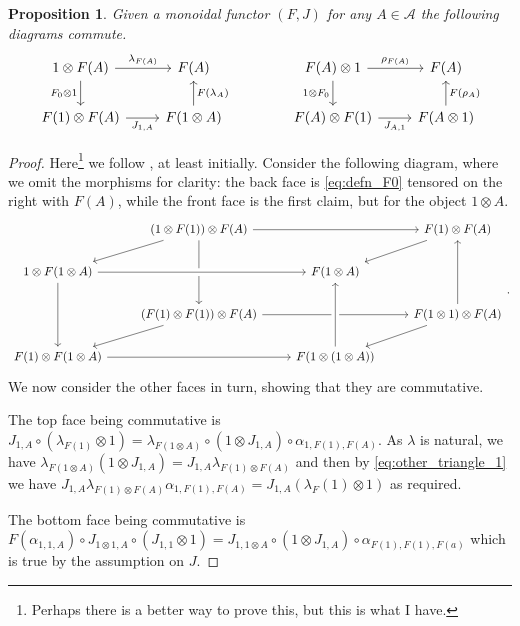 \documentclass[a4paper,11pt]{article}
\theoremstyle{plain}
\newtheorem{proposition}{Proposition}[section]
\theoremstyle{remark}
\newcommand{\mc}[1]{\mathcal{#1}}
\begin{document}
\begin{proposition}\label{prop:F0_action_general}
Given a monoidal functor $(F, J)$ for any $A\in\mc A$ the following diagrams commute.
\[\begin{tikzcd}
  1 \otimes F(A) \ar[r, "\lambda_{F(A)}"] \ar[d, "F_0\otimes 1"'] & F(A) \\
  F(1) \otimes F(A) \ar[r, "J_{1,A}"'] & F(1\otimes A) \ar[u, "F(\lambda_A)"']
\end{tikzcd}
\qquad\qquad
\begin{tikzcd}
F(A)\otimes 1 \ar[r, "\rho_{F(A)}"] \ar[d, "1\otimes F_0"']  & F(A) \\
F(A) \otimes F(1) \ar[r, "J_{A,1}"']  & F(A\otimes 1) \ar[u, "F(\rho_A)"']
\end{tikzcd}
\]
\end{proposition}
\begin{proof}
Here\footnote{Perhaps there is a better way to prove this, but this is what I have.} we follow \cite{MS5061586}, at least initially.
Consider the following diagram, where we omit the morphisms for clarity: the back face is \eqref{eq:defn_F0} tensored on the right with $F(A)$, while the front face is the first claim, but for the object $1\otimes A$.
\[\begin{tikzcd}
&   (1 \otimes F(1))\otimes F(A)  \ar[rr] \ar[dd] \ar[ld] && F(1)\otimes F(A) \ar[ld]   \\
1 \otimes F(1\otimes A) \ar[dd] \ar[rr, crossing over]  &&  F(1\otimes A)  \\
&   (F(1) \otimes F(1))\otimes F(A) \ar[rr] \ar[ld]  &&  F(1\otimes 1)\otimes F(A) \ar[ld] \ar[uu] \\
F(1) \otimes F(1\otimes A)   \ar[rr]   && F(1\otimes (1\otimes A))  \ar[uu, crossing over]
\end{tikzcd}. \]
We now consider the other faces in turn, showing that they are commutative.

The top face being commutative is $J_{1,A} \circ (\lambda_{F(1)}\otimes 1) = \lambda_{F(1\otimes A)} \circ (1\otimes J_{1,A}) \circ \alpha_{1,F(1),F(A)}$.  As $\lambda$ is natural, we have $\lambda_{F(1\otimes A)} (1\otimes J_{1,A}) = J_{1,A} \lambda_{F(1)\otimes F(A)}$ and then by \eqref{eq:other_triangle_1} we have $J_{1,A} \lambda_{F(1)\otimes F(A)}\alpha_{1,F(1),F(A)} = J_{1,A} (\lambda_F(1)\otimes 1)$ as required.

The bottom face being commutative is $F(\alpha_{1,1,A}) \circ J_{1\otimes 1,A}\circ (J_{1,1}\otimes 1) = J_{1,1\otimes A} \circ (1\otimes J_{1,A})\circ \alpha_{F(1), F(1), F(a)}$ which is true by the assumption on $J$.


\end{proof}
\end{document}
